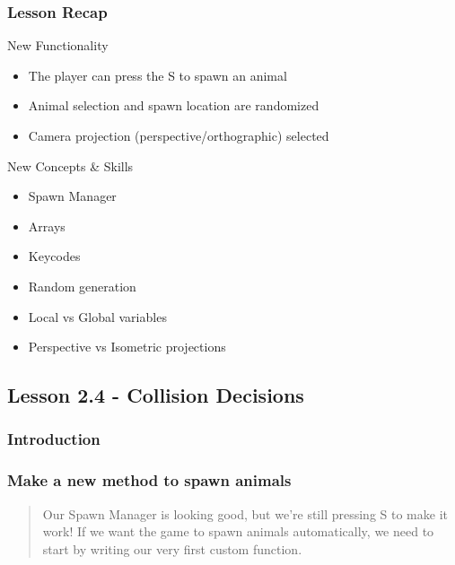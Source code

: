 \documentclass[
]{book}
\providecommand{\tightlist}{%
  \setlength{\itemsep}{0pt}\setlength{\parskip}{0pt}}
\begin{document}
\hypertarget{lesson-recap-2}{%
\subsubsection{Lesson Recap}\label{lesson-recap-2}}

New Functionality

\begin{itemize}
\tightlist
\item
  The player can press the S to spawn an animal
\item
  Animal selection and spawn location are randomized
\item
  Camera projection (perspective/orthographic) selected
\end{itemize}

New Concepts \& Skills

\begin{itemize}
\tightlist
\item
  Spawn Manager
\item
  Arrays
\item
  Keycodes
\item
  Random generation
\item
  Local vs Global variables
\item
  Perspective vs Isometric projections
\end{itemize}

\hypertarget{lesson-2.4---collision-decisions}{%
\subsection{Lesson 2.4 - Collision Decisions}\label{lesson-2.4---collision-decisions}}

\hypertarget{introduction-3}{%
\subsubsection{Introduction}\label{introduction-3}}

\hypertarget{make-a-new-method-to-spawn-animals}{%
\subsubsection{Make a new method to spawn animals}\label{make-a-new-method-to-spawn-animals}}

\begin{quote}
Our Spawn Manager is looking good, but we're still pressing S to make it work! If we want the game to spawn animals automatically, we need to start by writing our very first custom function.
\end{quote}
\end{document}
